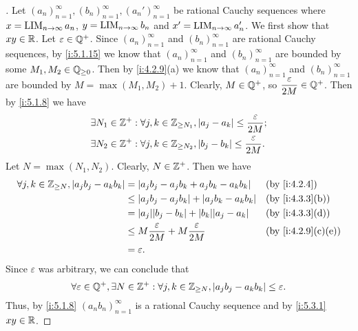 \begin{proof}[]
  Let \((a_n)_{n = 1}^\infty, (b_n)_{n = 1}^\infty, (a_n')_{n = 1}^\infty\) be rational Cauchy sequences where \(x = \operatorname*{LIM}_{n \to \infty} a_n\), \(y = \operatorname*{LIM}_{n \to \infty} b_n\) and \(x' = \operatorname*{LIM}_{n \to \infty} a_n'\).
  We first show that \(xy \in \mathbb{R}\).
  Let \(\varepsilon \in \mathbb{Q}^+\).
  Since \((a_n)_{n = 1}^\infty\) and \((b_n)_{n = 1}^\infty\) are rational Cauchy sequences, by \cref{i:5.1.15} we know that \((a_n)_{n = 1}^\infty\) and \((b_n)_{n = 1}^\infty\) are bounded by some \(M_1, M_2 \in \mathbb{Q}_{\geq 0}\).
  Then by \cref{i:4.2.9}(a) we know that \((a_n)_{n = 1}^\infty\) and \((b_n)_{n = 1}^\infty\) are bounded by \(M = \max(M_1, M_2) + 1\).
  Clearly, \(M \in \mathbb{Q}^+\), so \(\dfrac{\varepsilon}{2M} \in \mathbb{Q}^+\).
  Then by \cref{i:5.1.8} we have
  \begin{align*}
     & \exists N_1 \in \mathbb{Z}^+ : \forall j, k \in \mathbb{Z}_{\geq N_1}, \left\lvert a_j - a_k\right\rvert \leq \dfrac{\varepsilon}{2M}; \\
     & \exists N_2 \in \mathbb{Z}^+ : \forall j, k \in \mathbb{Z}_{\geq N_2}, \left\lvert b_j - b_k\right\rvert \leq \dfrac{\varepsilon}{2M}.
  \end{align*}
  Let \(N = \max(N_1, N_2)\).
  Clearly, \(N \in \mathbb{Z}^+\).
  Then we have
  \begin{align*}
    \forall j, k \in \Z_{\geq N}, \abs{a_j b_j - a_k b_k} & = \abs{a_j b_j - a_j b_k + a_j b_k - a_k b_k}              &  & \by{i:4.2.4}      \\
                                                          & \leq \abs{a_j b_j - a_j b_k} + \abs{a_j b_k - a_k b_k}     &  & \by{i:4.3.3}[b]   \\
                                                          & = \abs{a_j} \abs{b_j - b_k} + \abs{b_k} \abs{a_j - a_k}    &  & \by{i:4.3.3}[d]   \\
                                                          & \leq M \dfrac{\varepsilon}{2M} + M \dfrac{\varepsilon}{2M} &  & \by{i:4.2.9}[c,e] \\
                                                          & = \varepsilon.
  \end{align*}
  Since \(\varepsilon\) was arbitrary, we can conclude that
  \[
    \forall \varepsilon \in \mathbb{Q}^+, \exists N \in \mathbb{Z}^+ : \forall j, k \in \mathbb{Z}_{\geq N}, \left\lvert a_j b_j - a_k b_k\right\rvert \leq \varepsilon.
  \]
  Thus, by \cref{i:5.1.8} \((a_n b_n)_{n = 1}^\infty\) is a rational Cauchy sequence and by \cref{i:5.3.1} \(xy \in \mathbb{R}\).


\end{proof}

